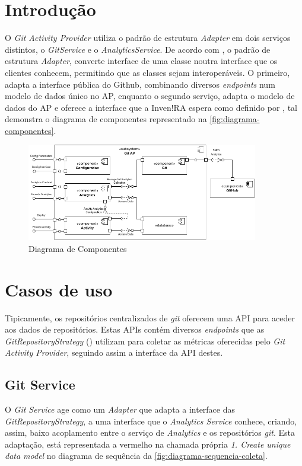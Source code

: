 \documentclass[12pt,a4paper,final]{article}
\begin{document}
    \section{Introdução}\label{sec:introducao}
    O \textit{Git Activity Provider} utiliza o padrão de estrutura \textit{Adapter} em dois serviços distintos, o \textit{GitService} e o \textit{AnalyticsService}.
    De acordo com \cite{gamma_1994_design}, o padrão de estrutura \textit{Adapter}, converte interface de uma classe noutra interface que os clientes conhecem, permitindo que as classes sejam interoperáveis.
    O primeiro, adapta a interface pública do Github, combinando diversos \textit{endpoints} num modelo de dados único no AP, enquanto o segundo serviço, adapta o modelo de dados do AP e oferece a interface que a Inven!RA espera como definido por \cite{su15010857}, tal demonstra o diagrama de componentes representado na \autoref{fig:diagrama-componentes}.

    \begin{figure}[H]
        \centering
        \includegraphics[width=0.9\textwidth]{diagrama_componentes_v2-AP.drawio}
        \caption{Diagrama de Componentes}
        \label{fig:diagrama-componentes}
    \end{figure}


    \section{Casos de uso}\label{sec:caso-de-uso}
    Tipicamente, os repositórios centralizados de \textit{git} oferecem uma API para aceder aos dados de repositórios.
    Estas APIs contém diversos \textit{endpoints} que as \textit{GitRepositoryStrategy} (\cite{gonalves_2024_gitrepositorystrategy}) utilizam para coletar as métricas oferecidas pelo \textit{Git Activity Provider}, seguindo assim a interface da API destes.

    \subsection{Git Service}\label{subsec:git-service}
    O \textit{Git Service} age como um \textit{Adapter} que adapta a interface das \textit{GitRepositoryStrategy}, a uma interface que o \textit{Analytics Service} conhece, criando, assim, baixo acoplamento entre o serviço de \textit{Analytics} e os repositórios \textit{git}.
    Esta adaptação, está representada a vermelho na chamada própria \textit{1. Create unique data model} no diagrama de sequência da \autoref{fig:diagrama-sequencia-coleta}.
\end{document}
